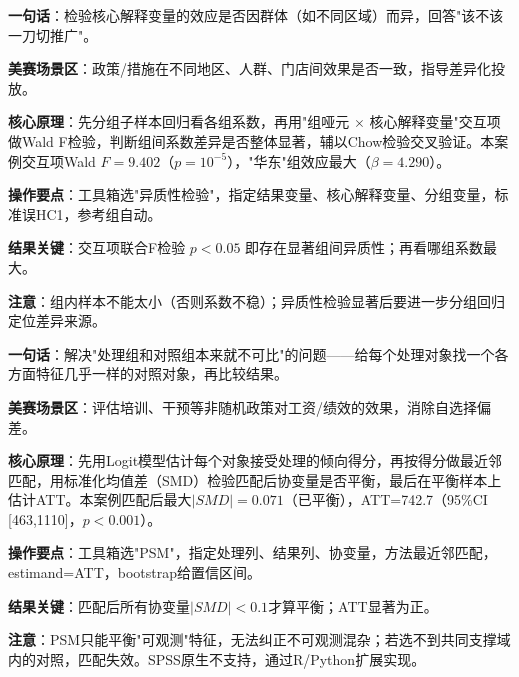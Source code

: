 \begin{algobrief}
\textbf{一句话}：检验核心解释变量的效应是否因群体（如不同区域）而异，回答"该不该一刀切推广"。

\textbf{美赛场景区}：政策/措施在不同地区、人群、门店间效果是否一致，指导差异化投放。

\textbf{核心原理}：先分组子样本回归看各组系数，再用"组哑元 $\times$ 核心解释变量"交互项做Wald F检验，判断组间系数差异是否整体显著，辅以Chow检验交叉验证。本案例交互项Wald $F=9.402$（$p=10^{-5}$），"华东"组效应最大（$\beta=4.290$）。

\textbf{操作要点}：工具箱选"异质性检验"，指定结果变量、核心解释变量、分组变量，标准误HC1，参考组自动。

\textbf{结果关键}：交互项联合F检验 $p<0.05$ 即存在显著组间异质性；再看哪组系数最大。

\textbf{注意}：组内样本不能太小（否则系数不稳）；异质性检验显著后要进一步分组回归定位差异来源。
\end{algobrief}


\begin{algobrief}
\textbf{一句话}：解决"处理组和对照组本来就不可比"的问题——给每个处理对象找一个各方面特征几乎一样的对照对象，再比较结果。

\textbf{美赛场景区}：评估培训、干预等非随机政策对工资/绩效的效果，消除自选择偏差。

\textbf{核心原理}：先用Logit模型估计每个对象接受处理的倾向得分，再按得分做最近邻匹配，用标准化均值差（SMD）检验匹配后协变量是否平衡，最后在平衡样本上估计ATT。本案例匹配后最大$|SMD|=0.071$（已平衡），ATT=742.7（95\%CI [463,1110]，$p<0.001$）。

\textbf{操作要点}：工具箱选"PSM"，指定处理列、结果列、协变量，方法最近邻匹配，estimand=ATT，bootstrap给置信区间。

\textbf{结果关键}：匹配后所有协变量$|SMD|<0.1$才算平衡；ATT显著为正。

\textbf{注意}：PSM只能平衡"可观测"特征，无法纠正不可观测混杂；若选不到共同支撑域内的对照，匹配失效。SPSS原生不支持，通过R/Python扩展实现。
\end{algobrief}


